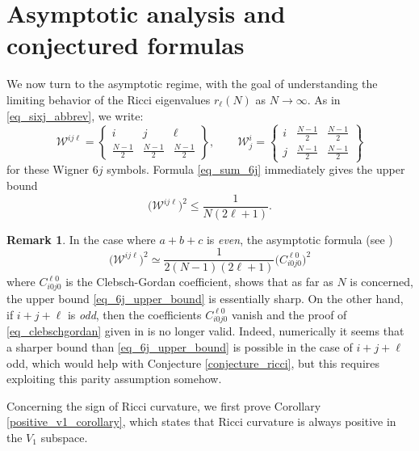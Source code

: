 \documentclass[11pt]{amsart}
\numberwithin{equation}{section}
\theoremstyle{definition}
\newtheorem{remark}{Remark}
\newcommand\sixJ[3]{\left\{\begin{matrix}
#1 & #2 & #3 \\
\frac{N-1}{2} & \frac{N-1}{2} & \frac{N-1}{2}
\end{matrix}
\right\}}
\begin{document}
\section{Asymptotic analysis and conjectured formulas}\label{section_asymptotic}

We now turn to the asymptotic regime, with the goal of understanding the limiting behavior of the Ricci eigenvalues $r_\ell(N)$ as $N \rightarrow \infty$. As in \eqref{eq_sixj_abbrev}, %
we write:
\begin{equation*}%
\mathcal{W}^{ij\ell} = \sixJ{i}{j}{\ell}, \qquad \mathcal{W}_j^i = \left\{\begin{matrix}
i & \frac{N-1}{2} & \frac{N-1}{2} \\ 
j & \frac{N-1}{2} & \frac{N-1}{2}
\end{matrix}
\right\}
\end{equation*}
for these Wigner $6j$ symbols. Formula \eqref{eq_sum_6j} immediately gives the upper bound
\begin{equation}\label{eq_6j_upper_bound}
\big(\mathcal{W}^{ij\ell}\big)^2 \leq \frac{1}{N(2\ell+1)}.
\end{equation}


\begin{remark}
In the case where $a+b+c$ is \emph{even}, the asymptotic formula (see \cite{brussaard1957classical})
\begin{equation}\label{eq_clebschgordan}
\big(\mathcal{W}^{ij\ell}\big)^2 \simeq \frac{1}{2(N-1)(2\ell+1)}\big(C^{\ell 0}_{i0j0}\big)^2
\end{equation}
where $C^{\ell 0}_{i0j0}$ is the Clebsch-Gordan coefficient, shows that as far as $N$ is concerned, the upper bound \eqref{eq_6j_upper_bound} is essentially sharp. On the other hand, if $i+j+\ell$ is \emph{odd}, then the coefficients $C^{\ell 0}_{i0j0}$ vanish and the proof of \eqref{eq_clebschgordan} given in \cite{brussaard1957classical} is no longer valid. Indeed, numerically it seems that a sharper bound than  \eqref{eq_6j_upper_bound} is possible in the case of  $i+j+\ell$ odd, which would help with Conjecture \ref{conjecture_ricci}, but this requires exploiting this parity assumption somehow.  
\end{remark}

Concerning the sign of Ricci curvature, we first prove Corollary \ref{positive_v1_corollary}, which states that Ricci curvature is always positive in the $V_1$ subspace.
\end{document}
